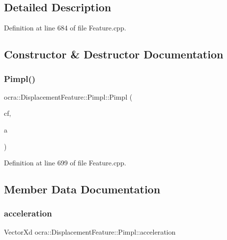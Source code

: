 \subsection{Detailed Description}


Definition at line 684 of file Feature.\+cpp.



\subsection{Constructor \& Destructor Documentation}
\hypertarget{structocra_1_1DisplacementFeature_1_1Pimpl_a74a8e0493ff78e399aef5f07e4a092e3}{}\label{structocra_1_1DisplacementFeature_1_1Pimpl_a74a8e0493ff78e399aef5f07e4a092e3} 
\subsubsection{\texorpdfstring{Pimpl()}{Pimpl()}}
{\footnotesize\ttfamily ocra\+::\+Displacement\+Feature\+::\+Pimpl\+::\+Pimpl (\begin{DoxyParamCaption}\item[{Control\+Frame\+::\+Ptr}]{cf,  }\item[{\hyperlink{namespaceocra_a436781c7059a0f76027df1c652126260}{E\+Cartesian\+Dof}}]{a }\end{DoxyParamCaption})\hspace{0.3cm}{\ttfamily [inline]}}



Definition at line 699 of file Feature.\+cpp.



\subsection{Member Data Documentation}
\hypertarget{structocra_1_1DisplacementFeature_1_1Pimpl_a1495e4c5c743c4c82a7948a9c6911e31}{}\label{structocra_1_1DisplacementFeature_1_1Pimpl_a1495e4c5c743c4c82a7948a9c6911e31} 
\subsubsection{\texorpdfstring{acceleration}{acceleration}}
{\footnotesize\ttfamily Vector\+Xd ocra\+::\+Displacement\+Feature\+::\+Pimpl\+::acceleration}



